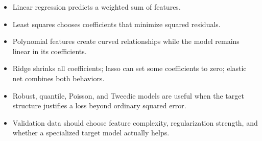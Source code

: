 \begin{chapterrecap}
\begin{itemize}
  \item Linear regression predicts a weighted sum of features.
  \item Least squares chooses coefficients that minimize squared residuals.
  \item Polynomial features create curved relationships while the model remains linear in its coefficients.
  \item Ridge shrinks all coefficients; lasso can set some coefficients to zero; elastic net combines both behaviors.
  \item Robust, quantile, Poisson, and Tweedie models are useful when the target structure justifies a loss beyond ordinary squared error.
  \item Validation data should choose feature complexity, regularization strength, and whether a specialized target model actually helps.
\end{itemize}
\end{chapterrecap}
